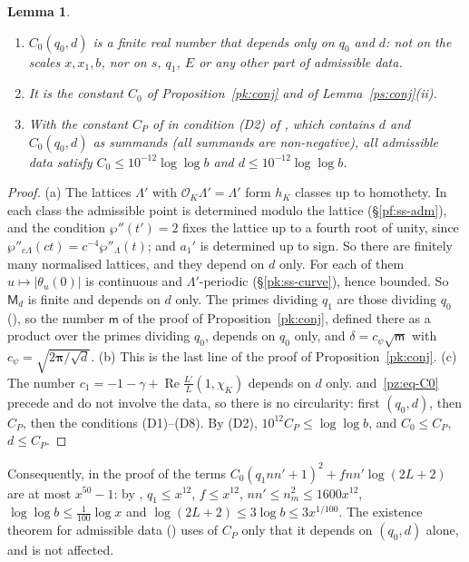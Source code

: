 \documentclass[10pt]{amsart}
\newtheorem{lemma}[theorem]{Lemma}
\theoremstyle{definition}
\theoremstyle{remark}
\newcommand{\Rel}{\operatorname{Re}}
\providecommand{\auO}{\mathcal O}
\begin{document}
\begin{lemma}\label{pz:C0}
\begin{enumerate}
\item[(a)] $C_0(q_0,d)$ is a finite real number that depends only on $q_0$ and $d$: not on the
scales $x,x_1,b$, nor on $s$, $q_1$, $E$ or any other part of admissible data.
\item[(b)] It is the constant $C_0$ of Proposition~\ref{pk:conj} and of Lemma~\ref{ps:conj}{\rm(ii)}.
\item[(c)] With the constant $C_P$ of {\cite[(35)]{P46}} in condition {\rm(D2)} of
{\cite[Definition~13.3]{P46}}, which contains $d$ and $C_0(q_0,d)$ as summands (all summands are
non-negative), all admissible data satisfy
$C_0\le10^{-12}\log\log b$ and $d\le10^{-12}\log\log b$.
\end{enumerate}
\end{lemma}
\begin{proof}
(a) The lattices $\Lambda'$ with $\auO_K\Lambda'=\Lambda'$ form $h_K$ classes up to homothety. In
each class the admissible point is determined modulo the lattice (\S\ref{pf:ss-adm}), and the
condition $\wp''(t')=2$ fixes the lattice up to a fourth root of unity, since
$\wp''_{c\Lambda}(ct)=c^{-4}\wp''_\Lambda(t)$; and $a_1'$ is determined up to sign. So there are
finitely many normalised lattices, and they depend on $d$ only. For each of them $u\mapsto|\theta_u
(0)|$ is continuous and $\Lambda'$-periodic (\S\ref{pk:ss-curve}), hence bounded. So $\mathsf M_d$
is finite and depends on $d$ only. The primes dividing $q_1$ are those dividing $q_0$
({\cite[\S13.1]{P46}}), so the number $\mathsf m$ of the proof of Proposition~\ref{pk:conj},
defined there as a product over the primes dividing $q_0$, depends on $q_0$ only, and $\delta=
c_\psi\sqrt{\mathsf m}$ with $c_\psi=\sqrt{2\boldsymbol\pi/\sqrt d}$. (b) This is the last line of
the proof of Proposition~\ref{pk:conj}. (c) The number $c_1=-1-\gamma+\Rel\frac{L'}L(1,\chi_K)$
depends on $d$ only. {\cite[Definition~13.1]{P46}} and~\eqref{pz:eq-C0} precede and do not involve
the data, so there is no circularity: first $(q_0,d)$, then $C_P$, then the conditions (D1)--(D8).
By (D2), $10^{12}C_P\le\log\log b$, and $C_0\le C_P$, $d\le C_P$.
\end{proof}

Consequently, in the proof of {\cite[Proposition~14.23]{P46}} the terms $C_0(q_1nn'+1)^2+fnn'\log(2L+2)$
are at most $x^{50}-1$: by {\cite[Lemma~13.4]{P46}}, $q_1\le x^{12}$, $f\le x^{12}$, $nn'\le
n_m^2\le1600x^{12}$, $\log\log b\le\tfrac1{100}\log x$ and $\log(2L+2)\le3\log b\le3x^{1/100}$. The
existence theorem for admissible data ({\cite[Theorem~13.9]{P46}}) uses of $C_P$ only that it
depends on $(q_0,d)$ alone, and is not affected.
\end{document}
